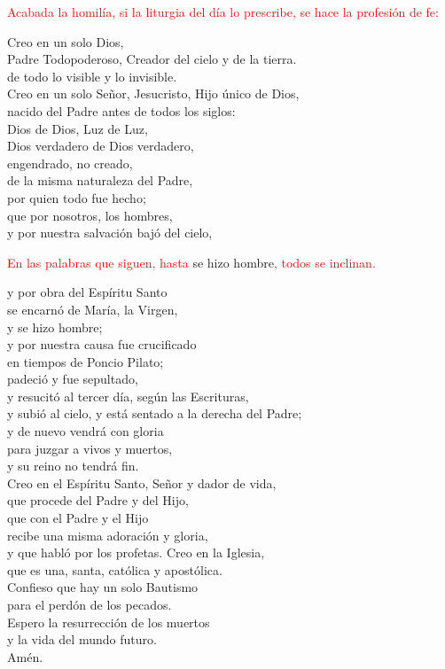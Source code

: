 \documentclass[12pt, letterpaper]{article}
\begin{document}
  \large {\textcolor{red}{Acabada la homil\'ia, si la liturgia del d\'ia lo prescribe, se hace la profesi\'on de fe:}}

  \noindent
  \Large {Creo en un solo Dios,\\
    Padre Todopoderoso, Creador del cielo y de la tierra.\\
    de todo lo visible y lo invisible.\\
    Creo en un solo Se\~nor, Jesucristo, Hijo \'unico de Dios,\\
    nacido del Padre antes de todos los siglos:\\
    Dios de Dios, Luz de Luz,\\
    Dios verdadero de Dios verdadero,\\
    engendrado, no creado,\\
    de la misma naturaleza del Padre,\\
    por quien todo fue hecho;\\
    que por nosotros, los hombres,\\
    y por nuestra salvaci\'on baj\'o del cielo,
  }

  \large {\textcolor{red}{En las palabras que siguen, hasta} se hizo hombre\textcolor{red}{, todos se inclinan.}}

  \noindent
  \Large {y por obra del Esp\'iritu Santo\\
    se encarn\'o de Mar\'ia, la Virgen,\\
    y se hizo hombre;\\
    y por nuestra causa fue crucificado\\
    en tiempos de Poncio Pilato;\\
    padeci\'o y fue sepultado,\\
    y resucit\'o al tercer d\'ia, seg\'un las Escrituras,\\
    y subi\'o al cielo, y est\'a sentado a la derecha del Padre;\\
    y de nuevo vendr\'a con gloria\\
    para juzgar a vivos y muertos,\\
    y su reino no tendr\'a fin.\\
    Creo en el Esp\'iritu Santo, Se\~nor y dador de vida,\\
    que procede del Padre y del Hijo,\\
    que con el Padre y el Hijo\\
    recibe una misma adoraci\'on y gloria,\\
    y que habl\'o por los profetas.
    Creo en la Iglesia,\\
    que es una, santa, cat\'olica y apost\'olica.\\
    Confieso que hay un solo Bautismo\\
    para el perd\'on de los pecados.\\
    Espero la resurrecci\'on de los muertos\\
    y la vida del mundo futuro.\\
    Am\'en.
  }
\end{document}

